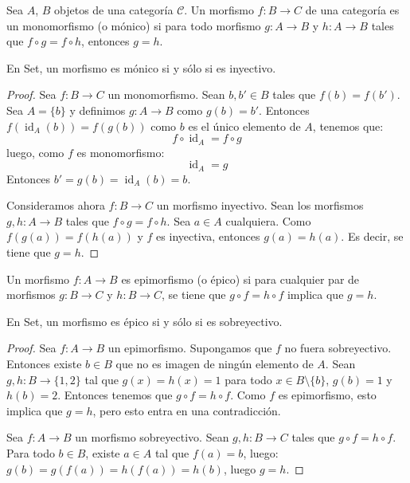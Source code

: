 \documentclass[12pt, twoside]{book}
\newcommand{\cat}{{\mathcal{C}}}
\newcommand{\Set}{{Set}}
\DeclareMathOperator{\id}{id}
\begin{document}
\begin{definition}
Sea $A$, $B$ objetos de una categoría $\cat$.
Un morfismo $f \colon B \to C$ de una categoría es un monomorfismo (o mónico) si para todo morfismo $g \colon A \to B$ y $h \colon A \to B$ tales que $f \circ g = f \circ h$, entonces $g = h$.
\end{definition}

\begin{proposition}
En \Set, un morfismo es mónico si y sólo si es inyectivo.
\end{proposition}

\begin{proof}
Sea $f \colon B \to C$ un monomorfismo. Sean $b, b' \in B$ tales que $f(b) = f(b')$. Sea $A = \{b\}$ y definimos $g \colon A \to B$ como $g(b)=b'$.
Entonces $f(\id_A(b)) = f(g(b))$
como $b$ es el único elemento de $A$, tenemos que:
\[ f \circ \id_A = f \circ g \]
luego, como $f$ es monomorfismo:
\[ \id_A = g \]
Entonces $b'=g(b)=\id_A(b)=b$.

Consideramos ahora $f \colon B \to C$ un morfismo inyectivo.
Sean los morfismos $g, h \colon A \to B$ tales que $f \circ g = f \circ h$.
Sea $a \in A$ cualquiera. Como $f(g(a)) = f(h(a))$ y $f$ es inyectiva, entonces $g(a) = h(a)$.
Es decir, se tiene que $g = h$. 
\end{proof}

\begin{definition}
Un morfismo $f \colon A \to B$ es epimorfismo (o épico) si para cualquier par de morfismos $g \colon B \to C$ y $h \colon B \to C$, se tiene que $g \circ f = h \circ f$ implica que $g = h$.
\end{definition}

\begin{proposition}
En \Set, un morfismo es épico si y sólo si es sobreyectivo.
\end{proposition}

\begin{proof}
Sea $f \colon A \to B$ un epimorfismo. Supongamos que $f$ no fuera sobreyectivo. Entonces existe $b \in B$ que no es imagen de ningún elemento de $A$. Sean $g, h \colon B \to \{1,2\}$ tal que $g(x)=h(x)=1$ para todo $x \in B \setminus \{b\}$, $g(b) = 1$ y $h(b) = 2$. Entonces tenemos que $g \circ f = h \circ f$. Como $f$ es epimorfismo, esto implica que $g = h$, pero esto entra en una contradicción.

Sea $f \colon A \to B$ un morfismo sobreyectivo. Sean $g, h \colon B \to C$ tales que $g \circ f = h \circ f$. Para todo $b \in B$, existe $a \in A$ tal que $f(a)=b$, luego: $g(b) = g(f(a)) = h(f(a)) = h(b)$, luego $g = h$.
\end{proof}
\end{document}
